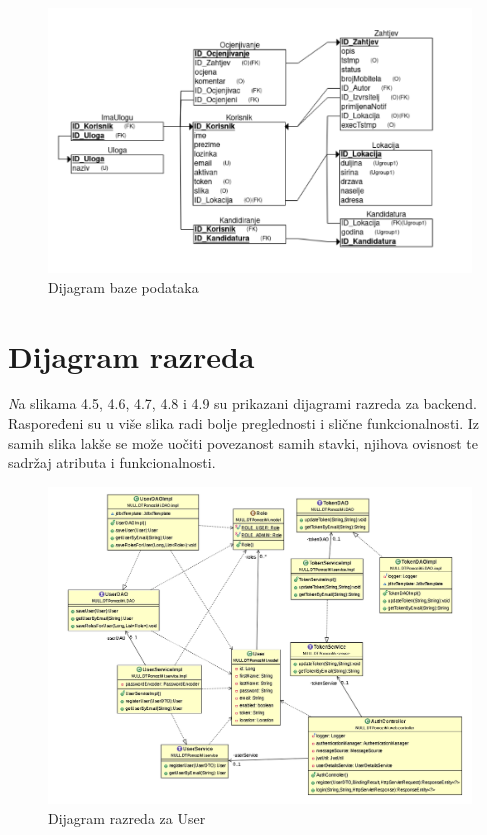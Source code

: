 			
			\begin{figure}[H]
				\includegraphics[scale=0.5]{slike/REL_DIJAGRAM.png} %
				\centering
				\caption {Dijagram baze podataka}
				\label{fig:promjene}
			\end{figure}
			
			\eject
			
		\section{Dijagram razreda}
		
			\textit Na slikama 4.5, 4.6, 4.7, 4.8 i 4.9 su prikazani dijagrami razreda za backend. Raspoređeni su u više slika radi bolje preglednosti i slične funkcionalnosti. Iz samih slika lakše se može uočiti povezanost samih stavki, njihova ovisnost te sadržaj atributa i funkcionalnosti.
			\begin{figure}[H]
				\includegraphics[scale=0.65]{slike/user.png} %
				\centering
				\caption { Dijagram razreda za User}
				\label{fig:promjene}
			\end{figure}
		
